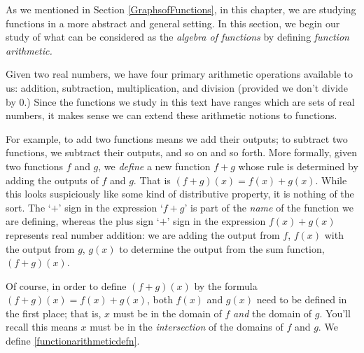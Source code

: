 

\setcounter{footnote}{0}

\label{FunctionArithmetic}

As we mentioned in Section \ref{GraphsofFunctions}, in this chapter, we are studying functions in a more abstract and general setting.  In this section, we begin our study of what can be considered as the \textit{algebra of functions}  by defining \textit{function arithmetic.}  

Given two real numbers,  we have four primary arithmetic operations available to us:  addition, subtraction, multiplication, and division (provided we don't divide by $0$.)  Since the functions we study in this text have ranges which are sets of real numbers, it makes sense we can extend these arithmetic notions to functions. 

For example,  to add two functions means  we add their outputs;  to subtract two functions, we subtract their outputs, and so on and so forth.  More formally, given two functions $f$ and $g$, we \textit{define} a new function $f+g$ whose rule is determined by adding the outputs of $f$ and $g$.  That is $(f+g)(x) = f(x) + g(x)$.  While  this looks suspiciously like some kind of distributive property, it is nothing of the sort.  The `$+$' sign in the expression `$f+g$' is part of the \textit{name} of the function we are defining, whereas the plus sign `$+$' sign in the expression $f(x) + g(x)$ represents real number addition: we are adding the output from $f$, $f(x)$ with the output from $g$, $g(x)$ to determine the output from the sum function, $(f+g)(x)$.

 Of course, in order to define $(f+g)(x)$ by the formula $(f+g)(x) = f(x) + g(x)$, both $f(x)$ and $g(x)$ need to be defined in the first place; that is, $x$ must be in the domain of $f$ \textit{and} the domain of $g$.  You'll recall this means $x$ must be in the \textit{intersection} of the domains of $f$ and $g$.   We define \autoref{functionarithmeticdefn}.
 
